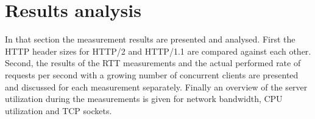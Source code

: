 \section{Results analysis}
\label{sec:results}
In that section the measurement results are presented and analysed. First the HTTP header sizes for HTTP/2 and HTTP/1.1 are compared against each other. Second, the results of the RTT measurements and the actual performed rate of requests per second with a growing number of concurrent clients are presented and discussed for each measurement separately. Finally an overview of the server utilization during the measurements is given for network bandwidth, CPU utilization and TCP sockets.  